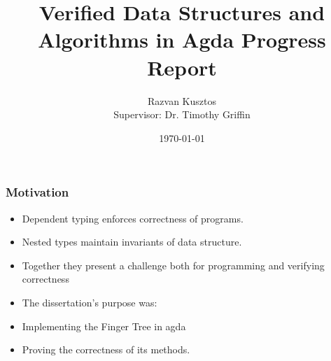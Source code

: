 \documentclass{beamer}
\title[Verified Structures in Agda - Progress]{Verified Data Structures and Algorithms in Agda  Progress Report} %
\author{Razvan Kusztos\\Supervisor: Dr. Timothy Griffin} %
\institute[rek43] %
{
University of Cambridge \\ %
\medskip
\textit{Part II} %
}
\date{\today} %
\begin{document}


\begin{frame}
\titlepage %
\end{frame}


\begin{frame}
\frametitle{Motivation} 
\begin{itemize} 
\item Dependent typing enforces correctness of programs.
\item Nested types maintain invariants of data structure.
\item Together they present a challenge both for programming and verifying correctness
\item The dissertation's purpose was: 
\item \hspace{5mm} Implementing the Finger Tree in agda
\item \hspace{5mm} 	Proving the correctness of its methods. 
\end{itemize} 

\end{frame}
\end{document}

